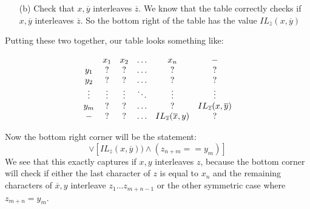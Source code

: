 \documentclass{article}
\begin{document}
\begin{itemize}
\begin{answer}
\begin{itemize}
                        \item [(b)] Check that $x, \overline{y}$ interleaves $\overline{z}$. We know that the table correctly checks if $x, \overline{y}$ interleaves $\overline{z}$. So the bottom right of the table has the value $IL_{\overline{z}}(x, \overline{y})$
                    \end{itemize}
                Putting these two together, our table looks something like:
                    \begin{center}
                        \begin{align*}
                            \begin{array}{ c c c c c c }
                                       & x_{1}  & x_{2}  & \ldots & x_{n}                                & -                                   \\
                                y_{1}  & ?      & ?      & \ldots & ?                                    & ?                                   \\
                                y_{2}  & ?      & ?      & \ldots & ?                                    & ?                                   \\
                                \vdots & \vdots & \vdots & \ddots & \vdots                               & \vdots                              \\
                                y_{m}  & ?      & ?      & \ldots & ?                                    & IL_{\overline{z}}(x, \overline{y}) \\
                                -      & ?      & ?      & \ldots & IL_{\overline{z}}(\overline{x}, y) & ?                                     
                            \end{array}
                        \end{align*}
                    \end{center}
                Now the bottom right corner will be the statement:
                    \begin{equation*}
                        [IL_{\overline{z}}(\overline{x}, y) \land (z_{m + n} == x_{n})] \lor [IL_{\overline{z}}(x, \overline{y})) \land (z_{n + m} == y_{m})]
                    \end{equation*}
                We see that this exactly captures if $x, y$ interleaves $z$, because the bottom corner will check if either the last character of $z$ is equal to $x_{n}$ and the remaining characters of $\overline{x}, y$ interleave $z_{1}\ldots z_{m + n - 1}$ or the other symmetric case where $z_{m + n} = y_{m}$.


\end{answer}
\end{itemize}
\end{document}
